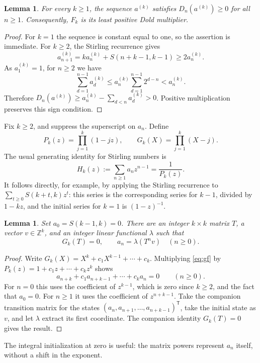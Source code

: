 \documentclass[11pt]{article}
\newtheorem{lemma}[theorem]{Lemma}
\theoremstyle{remark}
\begin{document}
\begin{lemma}\label{lem:sign}
For every $k\geq1$, the sequence $a^{(k)}$ satisfies $D_n(a^{(k)})\geq0$
for all $n\geq1$. Consequently, $F_k$ is its least positive Dold multiplier.
\end{lemma}
\begin{proof}
For $k=1$ the sequence is constant equal to one, so the assertion is
immediate. For $k\geq2$, the Stirling recurrence gives
\[
 a_{n+1}^{(k)}=k a_n^{(k)}+S(n+k-1,k-1)\geq2a_n^{(k)}.
\]
As $a_1^{(k)}=1$, for $n\geq2$ we have
\[
 \sum_{d=1}^{n-1}a_d^{(k)}
 \leq a_n^{(k)}\sum_{d=1}^{n-1}2^{d-n}<a_n^{(k)}.
\]
Therefore $D_n(a^{(k)})\geq a_n^{(k)}-\sum_{d<n}a_d^{(k)}>0$.
Positive multiplication preserves this sign condition.
\end{proof}

Fix $k\geq2$, and suppress the superscript on $a_n$. Define
\[
 P_k(z)=\prod_{j=1}^k(1-jz),\qquad
 G_k(X)=\prod_{j=1}^k(X-j).
\]
The usual generating identity for Stirling numbers is
\begin{equation}\label{eq:gf}
 H_k(z):=\sum_{n\geq1}a_nz^{n-1}=\frac1{P_k(z)}.
\end{equation}
It follows directly, for example, by applying the Stirling recurrence to
$\sum_{t\geq0}S(k+t,k)z^t$: this series is the corresponding series for
$k-1$, divided by $1-kz$, and the initial series for $k=1$ is $(1-z)^{-1}$.

\begin{lemma}\label{lem:companion}
Set $a_0=S(k-1,k)=0$. There are an integer $k\times k$ matrix $T$,
a vector $v\in\mathbb Z^k$, and an integer linear functional $\lambda$
such that
\[
 G_k(T)=0,\qquad a_n=\lambda(T^n v)\quad(n\geq0).
\]
\end{lemma}
\begin{proof}
Write $G_k(X)=X^k+c_1X^{k-1}+\cdots+c_k$.
Multiplying \eqref{eq:gf} by $P_k(z)=1+c_1z+\cdots+c_kz^k$ shows
\[
 a_{n+k}+c_1a_{n+k-1}+\cdots+c_ka_n=0\qquad(n\geq0).
\]
For $n=0$ this uses the coefficient of $z^{k-1}$, which is zero since
$k\geq2$, and the fact that $a_0=0$. For $n\geq1$ it uses the coefficient
of $z^{n+k-1}$. Take the companion transition matrix for the states
$(a_n,a_{n+1},\ldots,a_{n+k-1})^{\mathsf T}$, take the initial state as $v$,
and let $\lambda$ extract its first coordinate. The companion identity
$G_k(T)=0$ gives the result.
\end{proof}

The integral initialization at zero is useful: the matrix powers represent
$a_n$ itself, without a shift in the exponent.
\end{document}
